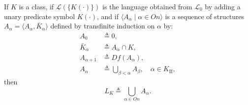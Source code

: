 If $K$ is a class, if $\mathcal{L}(\{K(\cdot)\})$ is the language obtained from $\mathcal{L}_0$ by adding a unary predicate symbol $K(\cdot)$, and if $\langle A_\alpha \mid \alpha \in On \rangle$ is a sequence of structures $A_\alpha = \langle A_\alpha, \bar{K}_\alpha \rangle$ defined by transfinite induction on $\alpha$ by:
\begin{align*}
A_0 &\triangleq 0,\\
\bar{K}_\alpha &\triangleq A_\alpha \cap K,\\
A_{\alpha+1} &\triangleq Df(A_\alpha),\\
A_\alpha &\triangleq \bigcup_{\beta < \alpha} A_\beta, \quad \alpha \in K_{\mathrm{II}},
\end{align*}
then
$$L_K \triangleq \bigcup_{\alpha \in On} A_\alpha.$$
